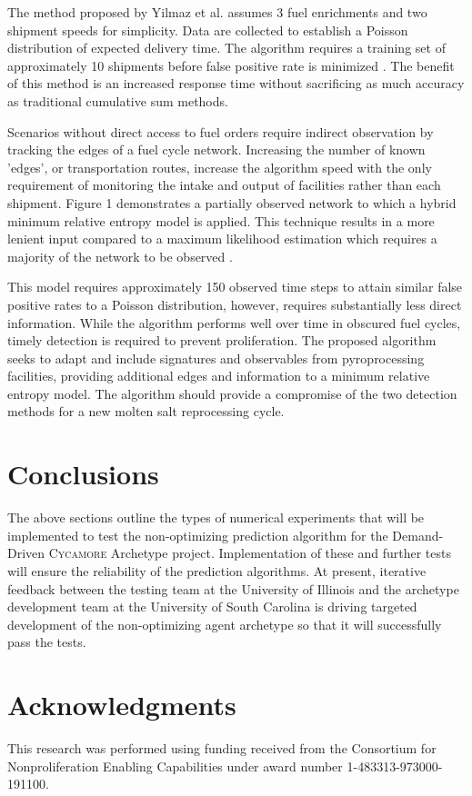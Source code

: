 \documentclass{anstrans}
\newcommand{\Cycamore}{\textsc{Cycamore}\xspace}%
\begin{document}
The method proposed by Yilmaz et al. assumes 3 fuel enrichments and two shipment speeds for simplicity. Data are collected to establish a Poisson distribution of expected delivery time. The algorithm requires a training set of approximately 10 shipments before false positive rate is minimized \cite{Yilmaz_2016}. The benefit of this method is an increased response time without sacrificing as much accuracy as traditional cumulative sum methods. 

Scenarios without direct access to fuel orders require indirect observation by tracking the edges of a fuel cycle network. Increasing the number of known 'edges', or transportation routes, increase the algorithm speed with the only requirement of monitoring the intake and output of facilities rather than each shipment. Figure 1 demonstrates a partially observed network to which a hybrid minimum relative entropy model is applied. This technique results in a more lenient input compared to a maximum likelihood estimation which requires a majority of the network to be observed \cite{Hou_2016}.


This model requires approximately 150 observed time steps to attain similar false positive rates to a Poisson distribution, however, requires substantially less direct information. While the algorithm performs well over time in obscured fuel cycles, timely detection is required to prevent proliferation. The proposed algorithm seeks to adapt and include signatures and observables from pyroprocessing facilities, providing additional edges and information to a minimum relative entropy model. The algorithm should provide a compromise of the two detection methods for a new molten salt reprocessing cycle.

\section{Conclusions}
The above sections outline the types of numerical experiments that will be 
implemented to test the non-optimizing prediction algorithm for the 
Demand-Driven \Cycamore Archetype project. Implementation of these and further 
tests will ensure the reliability of the prediction algorithms.  
At present, iterative feedback between the testing team at the University of 
Illinois and the archetype development team at the University of South Carolina 
is driving targeted development of the non-optimizing agent archetype so that 
it will successfully pass the tests. 

\section{Acknowledgments}
This research was performed using funding received from the Consortium for Nonproliferation Enabling Capabilities under award number 1-483313-973000-191100.



\end{document}
